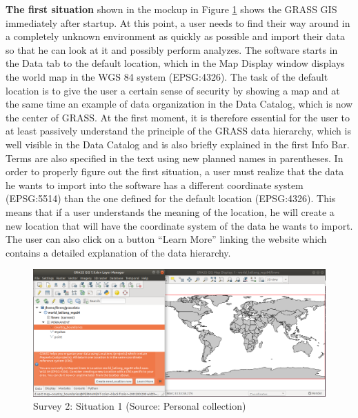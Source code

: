 \documentclass[a4paper,10pt,twoside]{article}
\begin{document}
\textbf{The first situation} shown in the mockup in Figure
\ref{fig:grass_infobar_1} shows the GRASS GIS immediately after
startup. At this point, a user needs to find their way around in a
completely unknown environment as quickly as possible and import their
data so that he can look at it and possibly perform analyzes. The
software starts in the Data tab to the default location, which in the
Map Display window displays the world map in the WGS 84 system
(EPSG:4326). The task of the default location is to give the user a
certain sense of security by showing a map and at the same time an
example of data organization in the Data Catalog, which is now the
center of GRASS. At the first moment, it is therefore essential for
the user to at least passively understand the principle of the GRASS
data hierarchy, which is well visible in the Data Catalog and is also
briefly explained in the first Info Bar. Terms are also specified in
the text using new planned names in parentheses. In order to properly
figure out the first situation, a user must realize that the data he
wants to import into the software has a different coordinate system
(EPSG:5514) than the one defined for the default location
(EPSG:4326). This means that if a user understands the meaning of the
location, he will create a new location that will have the coordinate
system of the data he wants to import. The user can also click on a
button ``Learn More'' linking the website \cite{hierarchy} which
contains a detailed explanation of the data hierarchy.

\vspace{0.3cm}
\begin{figure}[hbt!] 
\begin{center}
\includegraphics[width=17cm]{../pictures/grass_infobar_1.png} 
\caption[Survey 2: Situation 1]{Survey 2: Situation 1 (Source: Personal collection)}
\label{fig:grass_infobar_1}
\end{center}
\end{figure}
\end{document}
